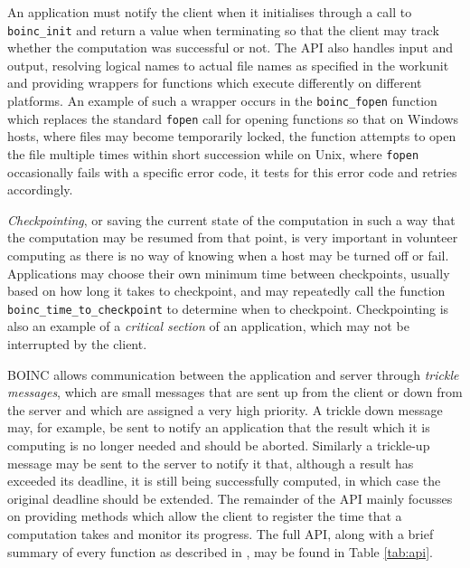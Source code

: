 An application must notify the client when it initialises through a call to \verb|boinc_init| and return a value when terminating so that the client may track whether the computation was successful or not. 
The API also handles input and output, resolving logical names to actual file names as specified in the workunit and providing wrappers for functions which execute differently on different platforms. An example of such a wrapper occurs in the  \verb|boinc_fopen| function which replaces the standard \texttt{fopen} call for opening functions so that on Windows hosts, where files may become temporarily locked, the function attempts to open the file multiple times within short succession while on Unix, where \texttt{fopen} occasionally fails with a specific error code, it tests for this error code and retries accordingly. 

\emph{Checkpointing}, or saving the current state of the computation in such a way that the computation may be resumed from that point, is very important in volunteer computing as there is no way of knowing when a host may be turned off or fail. Applications may choose their own minimum time between checkpoints, usually based on how long it takes to checkpoint, and may repeatedly call the function \verb|boinc_time_to_checkpoint| to determine when to checkpoint. Checkpointing is also an example of a \emph{critical section} of an application,   which may not be interrupted by the client.
 
BOINC  allows communication between the application and server through \emph{trickle messages}, which are small messages that are sent up from the client or down from the server and which are assigned a very high priority. A trickle down message may, for example, be sent to notify an application that the result which it is computing is no longer needed and should be aborted. Similarly a trickle-up message may be sent to the server to notify it that, although a result  has exceeded its deadline, it is still being successfully computed, in which case the original deadline should be extended.
The remainder of the API mainly focusses on providing methods which allow the client  to register the time that a computation takes and monitor its progress. The full API, along with a brief summary of every function as described in \cite{boincwiki}, may be found in Table \ref{tab:api}.


 
